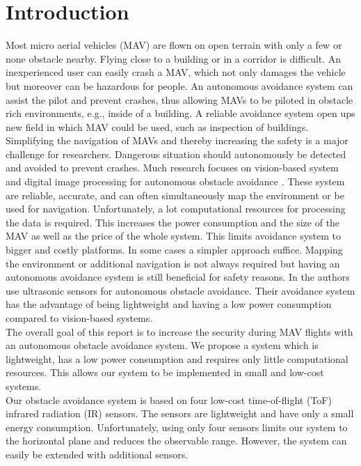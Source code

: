 \chapter{Introduction}
\label{sec:introduction}
Most micro aerial vehicles (MAV) are flown on open terrain with only a few or none obstacle nearby. Flying close to a building or in a corridor is difficult. An inexperienced user can easily crash a MAV, which not only damages the vehicle but moreover can be hazardous for people.  An autonomous avoidance system can assist the pilot and prevent crashes, thus allowing MAVs to be piloted in obstacle rich environments, e.g., inside of a building. A reliable avoidance system open ups new field in which MAV could be used, such as inspection of buildings.\\
Simplifying the navigation of MAVs and thereby increasing the safety is a major challenge for researchers. Dangerous situation should autonomously be detected and avoided to prevent crashes. Much research focuses on vision-based system and digital image processing for autonomous obstacle avoidance \cite{heng2011autonomous} \cite{frew2004vision} \cite{ahrens2009vision}. These system are reliable, accurate, and can often simultaneously map the environment or be used for navigation. Unfortunately, a lot computational resources for processing the data is required. This increases the power consumption and the size of the MAV as well as the price of the whole system. This limits avoidance system to bigger and costly platforms. In some cases a simpler approach suffice. Mapping the environment or additional navigation is not always required but having an autonomous avoidance system is still beneficial for safety reasons. In \cite{gupta2015obstacle} the authors use ultrasonic sensors for autonomous obstacle avoidance. Their avoidance system has the advantage of being lightweight and having a low power consumption compared to vision-based systems.\\
The overall goal of this report is to increase the security during MAV flights with an autonomous obstacle avoidance system. We propose a system which is lightweight, has a low power consumption and requires only little computational resources. This allows our system to be implemented in small and low-cost systems.\\ 
Our obstacle avoidance system is based on four low-cost time-of-flight (ToF) infrared radiation (IR) sensors. The sensors are lightweight and have only a small energy consumption. Unfortunately, using only four sensors limits our system to the horizontal plane and reduces the observable range. However, the system can easily be extended with additional sensors.\\
